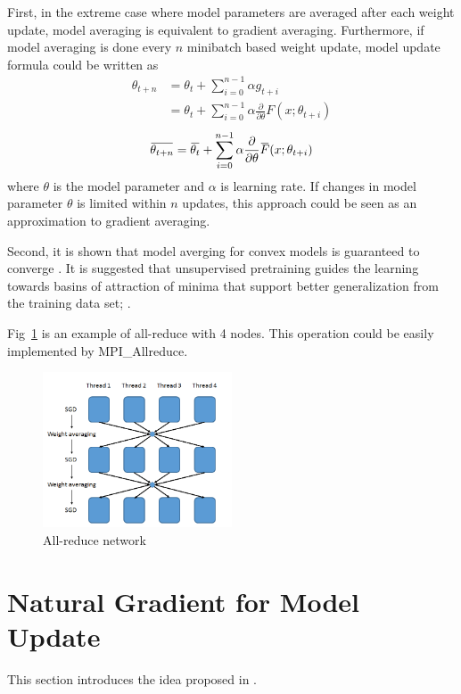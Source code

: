 \documentclass{article}
\newcommand{\overbar}[1]{\mkern 1.5mu\overline{\mkern-1.5mu#1\mkern-1.5mu}\mkern 1.5mu}
\begin{document}
First, in the extreme case where model parameters are averaged after each weight update, model averaging is equivalent to 
gradient averaging. Furthermore, if model averaging is done every $n$ minibatch based weight update, model update formula could
be written as
\begin{equation}
\begin{split}
\theta_{t+n} &= \theta_{t} +\sum_{i=0}^{n-1} \alpha g_{t+i}\\
&= \theta_{t} +\sum_{i=0}^{n-1} \alpha \frac{\partial}{\partial\theta} F(x;\theta_{t+i})
\end{split}
\end{equation}
\begin{equation}
\overbar{\theta_{t+n}} = \overbar{\theta_{t}} +\sum_{i=0}^{n-1} \alpha \frac{\partial}{\partial\theta} \overbar{F}(x;\theta_{t+i})
\end{equation}
where $\theta$ is the model parameter and $\alpha$ is learning rate. If changes in model parameter $\theta$ is limited 
within $n$ updates, this approach could be seen as an approximation to gradient averaging.

Second, it is shown that model averging for convex models is guaranteed to converge \cite{mcdonald2010distributed,mcdonald2009efficient}.
It is suggested that unsupervised pretraining guides the learning towards basins of attraction of minima that support better generalization
from the training data set; \cite{erhan2010does}.

Fig~\ref{fig:allreduce} is an example of all-reduce with 4 nodes. This operation could be easily implemented by MPI\_Allreduce.
\begin{figure}[htb]
  \centering
  \includegraphics[width=0.5\textwidth]{allreduce.png}
  \caption{All-reduce network}
  \label{fig:allreduce}
\end{figure}

\section{Natural Gradient for Model Update}
This section introduces the idea proposed in \cite{povey2014parallel}.
\end{document}
